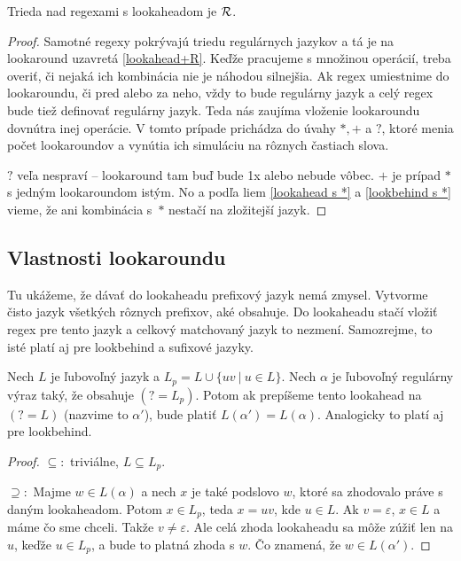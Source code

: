 \begin{veta} \label{reg_uz_la}
Trieda nad regexami s lookaheadom je ${\cal R}$.
\end{veta}
\begin{proof}
Samotné regexy pokrývajú triedu regulárnych jazykov a tá je na lookaround uzavretá \ref{lookahead+R}. Keďže pracujeme s množinou operácií, treba overiť, či nejaká ich kombinácia nie je náhodou silnejšia. Ak regex umiestnime do lookaroundu, či pred alebo za neho, vždy to bude regulárny jazyk a celý regex bude tiež definovať regulárny jazyk. Teda nás zaujíma vloženie lookaroundu dovnútra inej operácie. V tomto prípade prichádza do úvahy $*,+$ a $?$, ktoré menia počet lookaroundov a vynútia ich simuláciu na rôznych častiach slova.

$?$ veľa nespraví -- lookaround tam buď bude 1x alebo nebude vôbec. $+$ je prípad $*$ s jedným lookaroundom istým. No a podľa liem \ref{lookahead s *} a \ref{lookbehind s *} vieme, že ani kombinácia s~$*$ nestačí na zložitejší jazyk.
\end{proof}

\subsection{Vlastnosti lookaroundu}

Tu ukážeme, že dávať do lookaheadu prefixový jazyk nemá zmysel. Vytvorme čisto jazyk všetkých rôznych prefixov, aké obsahuje. Do lookaheadu stačí vložiť regex pre tento jazyk a celkový matchovaný jazyk to nezmení. Samozrejme, to isté platí aj pre lookbehind a sufixové jazyky.

\begin{veta}\label{bezprefixove}
Nech $L$ je ľubovoľný jazyk a $L_p = L \cup \lbrace uv ~|~ u \in L \rbrace$. Nech $\alpha$ je ľubovoľný regulárny výraz taký, že obsahuje $(?=L_p)$. Potom ak prepíšeme tento lookahead na $(?=L)$ (nazvime to $\alpha '$), bude platiť $L(\alpha ') = L(\alpha )$. Analogicky to platí aj pre lookbehind.
\end{veta}
\begin{proof}
$\subseteq :$ triviálne,  $L \subseteq L_p$.

$\supseteq :$ Majme $w \in L(\alpha)$ a nech $x$ je také podslovo $w$, ktoré sa zhodovalo práve s daným lookaheadom. Potom $x \in L_p$, teda $x=uv$, kde $u \in L$. Ak $v=\varepsilon$, $x \in L$ a máme čo sme chceli. Takže $v\neq \varepsilon$. Ale celá zhoda lookaheadu sa môže zúžiť len na $u$, keďže $u \in L_p$, a bude to platná zhoda s $w$. Čo znamená, že $w \in L(\alpha ')$.
\end{proof}

